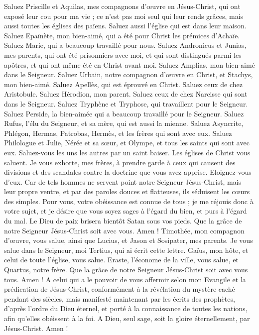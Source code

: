 \begin{multicols}{2}
Saluez Priscille et Aquilas, mes compagnons d’œuvre en Jésus-Christ,
qui ont exposé leur cou pour ma vie ; ce n’est pas moi seul qui leur rends grâces, mais aussi toutes les églises des païens.
Saluez aussi l'église qui est dans leur maison. Saluez Epaïnète, mon bien-aimé, qui a été pour Christ les prémices d'Achaïe.
Saluez Marie, qui a beaucoup travaillé pour nous.
Saluez Andronicus et Junias, mes parents, qui ont été prisonniers avec moi, et qui sont distingués parmi les apôtres, et qui ont même été en Christ avant moi.
Saluez Amplias, mon bien-aimé dans le Seigneur.
Saluez Urbain, notre compagnon d’œuvre en Christ, et Stachys, mon bien-aimé.
Saluez Apellès, qui est éprouvé en Christ. Saluez ceux de chez Aristobule.
Saluez Hérodion, mon parent. Saluez ceux de chez Narcisse qui sont dans le Seigneur.
Saluez Tryphène et Tryphose, qui travaillent pour le Seigneur. Saluez Perside, la bien-aimée qui a beaucoup travaillé pour le Seigneur.
Saluez Rufus, l’élu du Seigneur, et sa mère, qui est aussi la mienne.
Saluez Asyncrite, Phlégon, Hermas, Patrobas, Hermès, et les frères qui sont avec eux.
Saluez Philologue et Julie, Nérée et sa sœur, et Olympe, et tous les saints qui sont avec eux.
Saluez-vous les uns les autres par un saint baiser. Les églises de Christ vous saluent.
Je vous exhorte, mes frères, à prendre garde à ceux qui causent des divisions et des scandales contre la doctrine que vous avez apprise. Eloignez-vous d'eux.
Car de tels hommes ne servent point notre Seigneur Jésus-Christ, mais leur propre ventre, et par des paroles douces et flatteuses, ils séduisent les cœurs des simples.
Pour vous, votre obéissance est connue de tous ; je me réjouis donc à votre sujet, et je désire que vous soyez sages à l’égard du bien, et purs à l’égard du mal.
Le Dieu de paix brisera bientôt Satan sous vos pieds. Que la grâce de notre Seigneur Jésus-Christ soit avec vous. Amen !
Timothée, mon compagnon d’œuvre, vous salue, ainsi que Lucius, et Jason et Sosipater, mes parents.
Je vous salue dans le Seigneur, moi Tertius, qui ai écrit cette lettre.
Gaïus, mon hôte, et celui de toute l'église, vous salue. Eraste, l’économe de la ville, vous salue, et Quartus, notre frère.
\TextTitle{[Bénédiction]}
Que la grâce de notre Seigneur Jésus-Christ soit avec vous tous. Amen !
A celui qui a le pouvoir de vous affermir selon mon Evangile et la prédication de Jésus-Christ, conformément à la révélation du mystère caché pendant des siècles,
mais manifesté maintenant par les écrits des prophètes, d’après l’ordre du Dieu éternel, et porté à la connaissance de toutes les nations, afin qu’elles obéissent à la foi.
A Dieu, seul sage, soit la gloire éternellement, par Jésus-Christ. Amen !
\PPE{}
\end{multicols}
